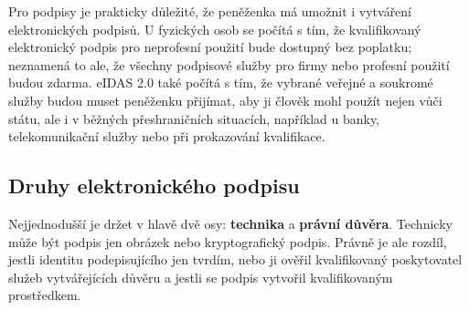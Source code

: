 Pro podpisy je prakticky důležité, že peněženka má umožnit i vytváření elektronických podpisů. U fyzických osob se počítá s tím, že kvalifikovaný elektronický podpis pro neprofesní použití bude dostupný bez poplatku; neznamená to ale, že všechny podpisové služby pro firmy nebo profesní použití budou zdarma. eIDAS 2.0 také počítá s tím, že vybrané veřejné a soukromé služby budou muset peněženku přijímat, aby ji člověk mohl použít nejen vůči státu, ale i v běžných přeshraničních situacích, například u banky, telekomunikační služby nebo při prokazování kvalifikace.


\subsection*{Druhy elektronického podpisu}
Nejjednodušší je držet v hlavě dvě osy: \textbf{technika} a \textbf{právní důvěra}. Technicky může být podpis jen obrázek nebo kryptografický podpis. Právně je ale rozdíl, jestli identitu podepisujícího jen tvrdím, nebo ji ověřil kvalifikovaný poskytovatel služeb vytvářejících důvěru a jestli se podpis vytvořil kvalifikovaným prostředkem.

